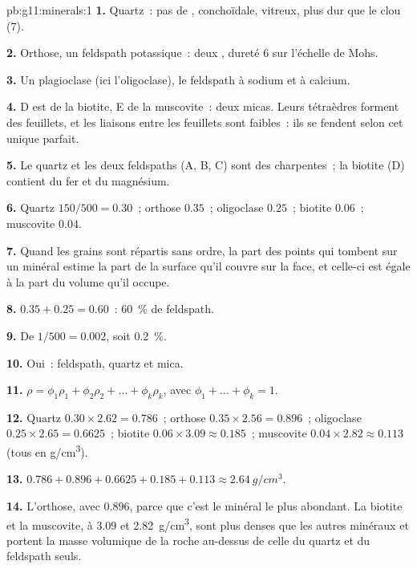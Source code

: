 \begin{solution}{pb:g11:minerals:1}
\textbf{1.} Quartz~: pas de ,  conchoïdale,  vitreux,
plus dur que le clou (7).

\textbf{2.} Orthose, un feldspath potassique~: deux , dureté 6 sur
l'échelle de Mohs.

\textbf{3.} Un plagioclase (ici l'oligoclase), le feldspath à sodium
et à calcium.

\textbf{4.} D est de la biotite, E de la muscovite~: deux micas. Leurs
tétraèdres forment des feuillets, et les liaisons entre les feuillets sont
faibles~: ils se fendent selon cet unique  parfait.

\textbf{5.} Le quartz et les deux feldspaths (A, B, C) sont des
charpentes~; la biotite (D) contient du fer et du magnésium.

\textbf{6.} Quartz $150/500 = 0.30$~; orthose $0.35$~; oligoclase $0.25$~;
biotite $0.06$~; muscovite $0.04$.

\textbf{7.} Quand les grains sont répartis sans ordre, la part des points
qui tombent sur un minéral estime la part de la surface qu'il couvre sur la
face, et celle-ci est égale à la part du volume qu'il occupe.

\textbf{8.} $0.35 + 0.25 = 0.60$~: \qty{60}{\percent} de feldspath.

\textbf{9.} De $1/500 = 0.002$, soit \qty{0.2}{\percent}.

\textbf{10.} Oui~: feldspath, quartz et mica.

\textbf{11.} $\rho = \phi_1 \rho_1 + \phi_2 \rho_2 + \dots + \phi_k \rho_k$,
avec $\phi_1 + \dots + \phi_k = 1$.

\textbf{12.} Quartz $0.30 \times 2.62 = 0.786$~; orthose $0.35 \times 2.56 =
0.896$~; oligoclase $0.25 \times 2.65 = 0.6625$~; biotite $0.06 \times 3.09
\approx 0.185$~; muscovite $0.04 \times 2.82 \approx 0.113$ (tous en
\unit{g/cm^3}).

\textbf{13.} $0.786 + 0.896 + 0.6625 + 0.185 + 0.113 \approx
\qty{2.64}{g/cm^3}$.

\textbf{14.} L'orthose, avec $0.896$, parce que c'est le minéral le plus
abondant. La biotite et la muscovite, à \qty{3.09}{} et \qty{2.82}{g/cm^3},
sont plus denses que les autres minéraux et portent la masse volumique de
la roche au-dessus de celle du quartz et du feldspath seuls.


\end{solution}
